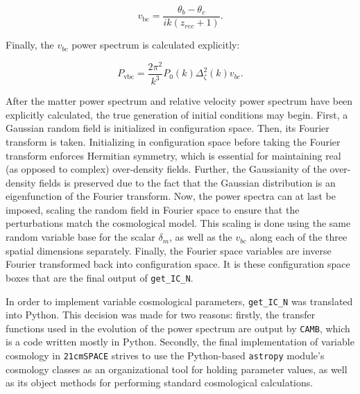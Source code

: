 \documentclass[floats,floatfix,showpacs,amssymb,prd,superscriptaddress,nofootinbib, 11pt]{revtex4-2} %
\newcommand{\code}{\texttt}
\newcommand{\red}{\textcolor{red}}
\begin{document}
\begin{equation}
    v_\text{bc} = \frac{\theta_b - \theta_c}{i k (z_{rec} + 1)}.
\end{equation}

Finally, the $v_{bc}$ power spectrum is calculated explicitly:

\begin{equation}
    P_{\text{vbc}} = \frac{2 \pi^2}{k^3} P_0 (k) \Delta_\zeta ^2 (k)v_{bc}.
\end{equation}

After the matter power spectrum and relative velocity power spectrum have been explicitly calculated, the true generation of initial conditions may begin. First, a Gaussian random field is initialized in configuration space. Then, its Fourier transform is taken. Initializing in configuration space before taking the Fourier transform enforces Hermitian symmetry, which is essential for maintaining real (as opposed to complex) over-density fields. Further, the Gaussianity of the over-density fields is preserved due to the fact that the Gaussian distribution is an eigenfunction of the Fourier transform. Now, the power spectra can at last be imposed, scaling the random field in Fourier space to ensure that the perturbations match the cosmological model. This scaling is done using the same random variable base for the scalar $\delta_m$, as well as the $v_{bc}$ along each of the three spatial dimensions separately. Finally, the Fourier space variables are inverse Fourier transformed back into configuration space. It is these configuration space boxes that are the final output of \code{get\_IC\_N}.


In order to implement variable cosmological parameters, \code{get\_IC\_N} was translated into Python. This decision was made for two reasons: firstly, the transfer functions used in the evolution of the power spectrum are output by \code{CAMB}, which is a code written mostly in Python. Secondly, the final implementation of variable cosmology in \code{21cmSPACE} strives to use the Python-based \code{astropy} module's cosmology classes as an organizational tool for holding parameter values, as well as its object methods for performing standard cosmological calculations. %
\end{document}
